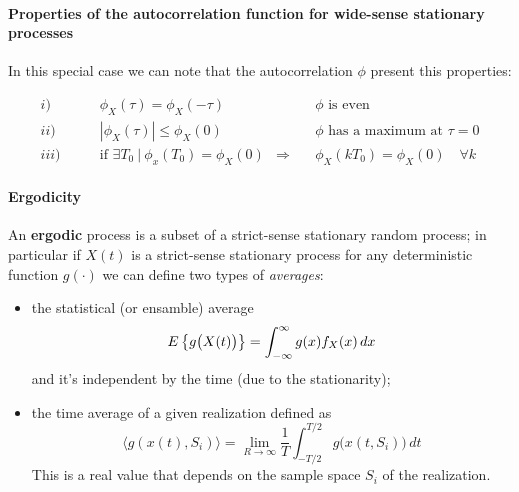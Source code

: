 	\paragraph{Properties of the autocorrelation function for wide-sense stationary processes} In this special case we can note that the autocorrelation $\phi$ present this properties:
	
	\begin{align*}
		i)& \qquad \phi_X(\tau) = \phi_X(-\tau) && \textrm{$\phi$ is even} \\
		ii)& \qquad \left|\phi_X(\tau)\right| \leq \phi_X(0)  && \textrm{$\phi$ has a maximum at $\tau = 0$} \\
		iii)& \qquad \textrm{if } \exists T_0 \ | \ \phi_x(T_0) = \phi_X(0)  &\Rightarrow \quad &  \phi_X(kT_0) = \phi_X(0) \quad \forall k
	\end{align*}
	
	\paragraph{Ergodicity} An \textbf{ergodic} process is a subset of a strict-sense stationary random process; in particular if $X(t)$ is a strict-sense stationary process for any deterministic function $g(\cdot)$ we can define two types of \textit{averages}:
	\begin{itemize}
		\item the statistical (or ensamble) average 
		\[ E\left\{g\big(X(t)\big)\right\} = \int_{-\infty}^\infty g(x) f_X(x)\, dx\]
		and it's independent by the time (due to the stationarity);
		\item the time average of a given realization defined as
		\[ \langle g(x(t), S_i) \rangle = \lim_{R\rightarrow \infty} \frac 1 T \int_{-T/2}^{T/2}  g\big(x(t,S_i)\big) \, dt \]
		This is a real value that depends on the sample space $S_i$ of the realization.
	\end{itemize}
	
